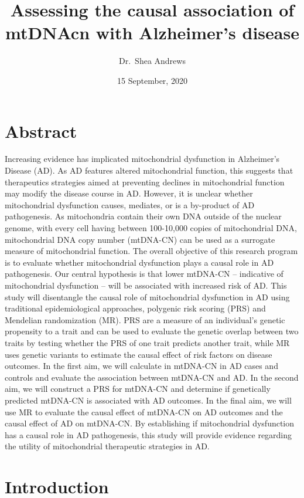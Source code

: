 \documentclass[]{book}
\title{Assessing the causal association of mtDNAcn with Alzheimer's disease}
\author{Dr.~Shea Andrews}
\date{15 September, 2020}
\begin{document}
\maketitle

{
\setcounter{tocdepth}{1}
\tableofcontents
}
\hypertarget{abstract}{%
\chapter*{Abstract}\label{abstract}}

Increasing evidence has implicated mitochondrial dysfunction in Alzheimer's Disease (AD). As AD features altered mitochondrial function, this suggests that therapeutics strategies aimed at preventing declines in mitochondrial function may modify the disease course in AD. However, it is unclear whether mitochondrial dysfunction causes, mediates, or is a by-product of AD pathogenesis. As mitochondria contain their own DNA outside of the nuclear genome, with every cell having between 100-10,000 copies of mitochondrial DNA, mitochondrial DNA copy number (mtDNA-CN) can be used as a surrogate measure of mitochondrial function. The overall objective of this research program is to evaluate whether mitochondrial dysfunction plays a causal role in AD pathogenesis. Our central hypothesis is that lower mtDNA-CN -- indicative of mitochondrial dysfunction -- will be associated with increased risk of AD. This study will disentangle the causal role of mitochondrial dysfunction in AD using traditional epidemiological approaches, polygenic risk scoring (PRS) and Mendelian randomization (MR). PRS are a measure of an individual's genetic propensity to a trait and can be used to evaluate the genetic overlap between two traits by testing whether the PRS of one trait predicts another trait, while MR uses genetic variants to estimate the causal effect of risk factors on disease outcomes. In the first aim, we will calculate in mtDNA-CN in AD cases and controls and evaluate the association between mtDNA-CN and AD. In the second aim, we will construct a PRS for mtDNA-CN and determine if genetically predicted mtDNA-CN is associated with AD outcomes. In the final aim, we will use MR to evaluate the causal effect of mtDNA-CN on AD outcomes and the causal effect of AD on mtDNA-CN. By establishing if mitochondrial dysfunction has a causal role in AD pathogenesis, this study will provide evidence regarding the utility of mitochondrial therapeutic strategies in AD.

\hypertarget{intro}{%
\chapter{Introduction}\label{intro}}
\end{document}
